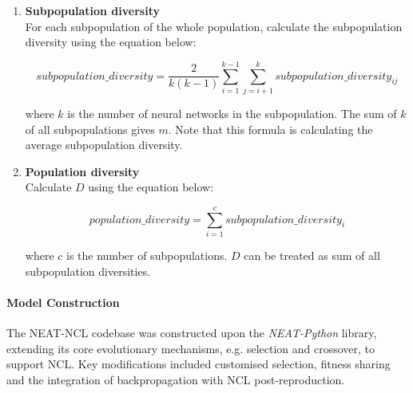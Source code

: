 \begin{enumerate}
    \begin{equation}
        \label{equation:neat_ncl_diversity_contribution}
        subpopulation\_diversity_{ij} = \frac{fitness_i + fitness_{j}}{2 \times fitness_{average}} \times genetic\_distance_{ij} \times output\_distance_{ij}
    \end{equation}

    where $f_{average}$ is the average fitness of the subpopulation. $fitness_i$ and $fitness_j$ are the fitness of the $i$th and $j$th networks respectively. 

    \item \textbf{Subpopulation diversity} \\
    For each subpopulation of the whole population, calculate the subpopulation diversity using the equation below: 

    \begin{equation}
        \label{equation:neat_ncl_subpopulation_diversity}
        subpopulation\_diversity = \frac{2}{k(k - 1)} \sum_{i = 1}^{k - 1} \sum_{j = i + 1}^k subpopulation\_diversity_{ij}
    \end{equation}

    where $k$ is the number of neural networks in the subpopulation. The sum of $k$ of all subpopulations gives $m$. Note that this formula is calculating the average subpopulation diversity. 

    \item \textbf{Population diversity} \\
    Calculate $D$ using the equation below: 

    \begin{equation}
        \label{equation:neat_ncl_population_diversity}
        population\_diversity = \sum_{i = 1}^c subpopulation\_diversity_{i}
    \end{equation}

    where $c$ is the number of subpopulations. $D$ can be treated as sum of all subpopulation diversities. 
\end{enumerate}


\paragraph{Model Construction}
The NEAT-NCL codebase was constructed upon the \textit{NEAT-Python} library, extending its core evolutionary mechanisms, e.g. selection and crossover, to support NCL. Key modifications included customised selection, fitness sharing and the integration of backpropagation with NCL post-reproduction. 

